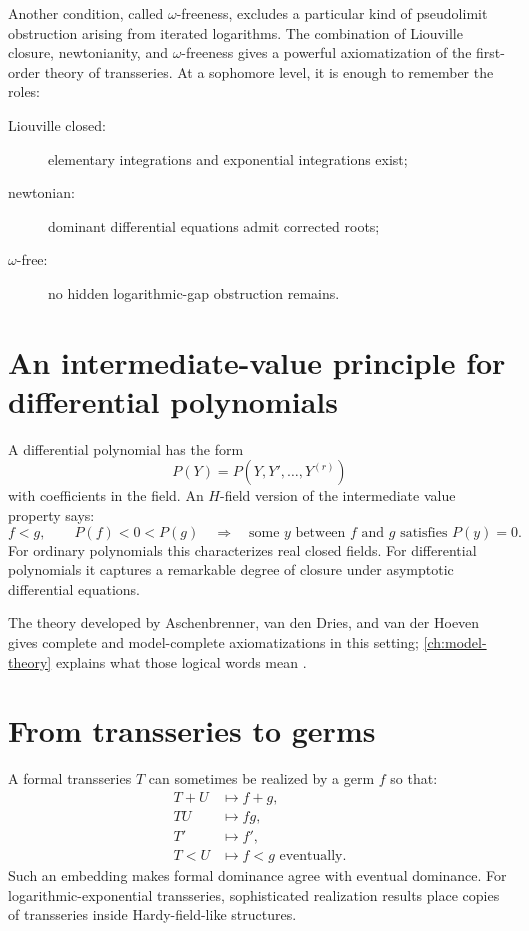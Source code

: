 \documentclass[11pt,openany]{book}
\theoremstyle{definition}
\theoremstyle{plain}
\theoremstyle{remark}
\begin{document}
Another condition, called $\omega$-freeness, excludes a particular kind of pseudolimit obstruction arising from iterated logarithms. The combination of Liouville closure, newtonianity, and $\omega$-freeness gives a powerful axiomatization of the first-order theory of transseries. At a sophomore level, it is enough to remember the roles:
\begin{description}
 \item[Liouville closed:] elementary integrations and exponential integrations exist;
 \item[newtonian:] dominant differential equations admit corrected roots;
 \item[$\omega$-free:] no hidden logarithmic-gap obstruction remains.
\end{description}

\section{An intermediate-value principle for differential polynomials}

A differential polynomial has the form
\[
 P(Y)=P(Y,Y',\dots,Y^{(r)})
\]
with coefficients in the field. An $H$-field version of the intermediate value property says:
\[
 f<g,\qquad P(f)<0<P(g)
 \quad\Longrightarrow\quad
 \text{some }y\text{ between }f\text{ and }g\text{ satisfies }P(y)=0.
\]
For ordinary polynomials this characterizes real closed fields. For differential polynomials it captures a remarkable degree of closure under asymptotic differential equations.

The theory developed by Aschenbrenner, van den Dries, and van der Hoeven gives complete and model-complete axiomatizations in this setting; \cref{ch:model-theory} explains what those logical words mean \cite{adh-book,adh-numbers}.

\section{From transseries to germs}

A formal transseries $T$ can sometimes be realized by a germ $f$ so that:
\begin{align*}
 T+U&\longmapsto f+g,\\
 TU&\longmapsto fg,\\
 T'&\longmapsto f',\\
 T<U&\longmapsto f<g\text{ eventually}.
\end{align*}
Such an embedding makes formal dominance agree with eventual dominance. For logarithmic-exponential transseries, sophisticated realization results place copies of transseries inside Hardy-field-like structures.
\end{document}
